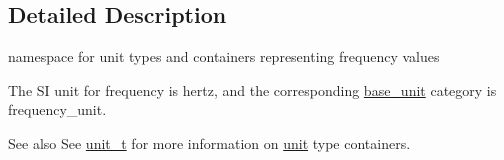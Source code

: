 \subsection{Detailed Description}
namespace for unit types and containers representing frequency values 

The S\+I unit for frequency is {\ttfamily hertz}, and the corresponding {\ttfamily \hyperlink{structunits_1_1base__unit}{base\+\_\+unit}} category is {\ttfamily frequency\+\_\+unit}. \begin{DoxySeeAlso}{See also}
See \hyperlink{classunits_1_1unit__t}{unit\+\_\+t} for more information on \hyperlink{structunits_1_1unit}{unit} type containers. 
\end{DoxySeeAlso}
